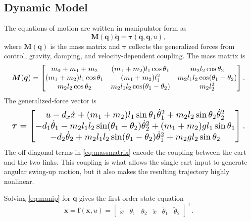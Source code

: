 \documentclass[conference]{IEEEtran}
\begin{document}
\subsection{Dynamic Model}
The equations of motion are written in manipulator form as
\begin{equation}
\bm{M}(\bm{q})\ddot{\bm{q}}
=
\bm{\tau}(\bm{q},\dot{\bm{q}},u),
\label{eq:manip}
\end{equation}
where $\bm{M}(\bm{q})$ is the mass matrix and $\bm{\tau}$ collects the generalized forces from control, gravity, damping, and velocity-dependent coupling. The mass matrix is
\begin{equation}
\resizebox{0.98\columnwidth}{!}{$
\displaystyle
\bm{M}(\bm{q}) =
\begin{bmatrix}
m_0 + m_1 + m_2 & (m_1+m_2)l_1\cos\theta_1 & m_2l_2\cos\theta_2 \\
(m_1+m_2)l_1\cos\theta_1 & (m_1+m_2)l_1^2 & m_2l_1l_2\cos(\theta_1-\theta_2) \\
m_2l_2\cos\theta_2 & m_2l_1l_2\cos(\theta_1-\theta_2) & m_2l_2^2
\end{bmatrix}.
$}
\label{eq:massmatrix}
\end{equation}
The generalized-force vector is
\begin{equation}
\resizebox{0.98\columnwidth}{!}{$
\displaystyle
\bm{\tau} =
\begin{bmatrix}
u - d_x \dot{x} + (m_1+m_2)l_1\sin\theta_1 \dot{\theta}_1^2 + m_2l_2\sin\theta_2 \dot{\theta}_2^2 \\
-d_1 \dot{\theta}_1 - m_2l_1l_2\sin(\theta_1-\theta_2)\dot{\theta}_2^2 + (m_1+m_2)gl_1\sin\theta_1 \\
-d_2 \dot{\theta}_2 + m_2l_1l_2\sin(\theta_1-\theta_2)\dot{\theta}_1^2 + m_2gl_2\sin\theta_2
\end{bmatrix}.
$}
\label{eq:generalizedforce}
\end{equation}
The off-diagonal terms in \eqref{eq:massmatrix} encode the coupling between the cart and the two links. This coupling is what allows the single cart input to generate angular swing-up motion, but it also makes the resulting trajectory highly nonlinear.

Solving \eqref{eq:manip} for $\ddot{\bm{q}}$ gives the first-order state equation
\begin{equation}
\dot{\bm{x}}
=
\bm{f}(\bm{x},u)
=
\begin{bmatrix}
\dot{x} & \dot{\theta}_1 & \dot{\theta}_2 &
\ddot{x} & \ddot{\theta}_1 & \ddot{\theta}_2
\end{bmatrix}^{\top}.
\end{equation}
\end{document}
